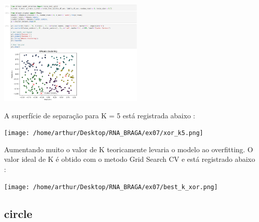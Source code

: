 \documentclass{article}
\begin{document}
\vspace{10pt}

\begin{center}

\includegraphics[height=2in]{xor_cluster.png}
        
\end{center}

\vspace{10pt}

A superfície de separação para K = 5 está registrada abaixo : 

\vspace{10pt}

\begin{center}

\texttt{[image: /home/arthur/Desktop/RNA\_BRAGA/ex07/xor\_k5.png]}
            
\end{center}

\vspace{10pt}

Aumentando muito o valor de K teoricamente levaria o modelo ao overfitting. O valor ideal de K é obtido com o metodo Grid Search CV e está registrado abaixo : 

\vspace{10pt}

\begin{center}

\texttt{[image: /home/arthur/Desktop/RNA\_BRAGA/ex07/best\_k\_xor.png]}
                
\end{center}



\vspace{20pt}



\subsection{circle}
\end{document}

